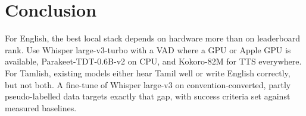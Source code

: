 \documentclass[conference]{IEEEtran}
\begin{document}
\section{Conclusion}
For English, the best local stack depends on hardware more than on leaderboard rank. Use Whisper large-v3-turbo with a VAD where a GPU or Apple GPU is available, Parakeet-TDT-0.6B-v2 on CPU, and Kokoro-82M for TTS everywhere. For Tamlish, existing models either hear Tamil well or write English correctly, but not both. A fine-tune of Whisper large-v3 on convention-converted, partly pseudo-labelled data targets exactly that gap, with success criteria set against measured baselines.



\end{document}
